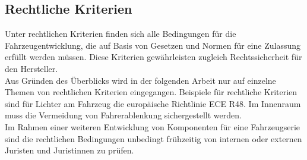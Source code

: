 \subsection{Rechtliche Kriterien}
Unter rechtlichen Kriterien finden sich alle Bedingungen für die Fahrzeugentwicklung, die auf Basis von Gesetzen und Normen für eine Zulassung erfüllt werden müssen. Diese Kriterien gewährleisten zugleich Rechtssicherheit für den Hersteller. \\
Aus Gründen des Überblicks wird in der folgenden Arbeit nur auf einzelne Themen von rechtlichen Kriterien eingegangen. 
Beispiele für rechtliche Kriterien sind für Lichter am Fahrzeug die europäische Richtlinie ECE R48. Im Innenraum muss die Vermeidung von Fahrerablenkung sichergestellt werden.\\
Im Rahmen einer weiteren Entwicklung von Komponenten für eine Fahrzeugserie sind die rechtlichen Bedingungen unbedingt frühzeitig von internen oder externen Juristen und Juristinnen zu prüfen.

